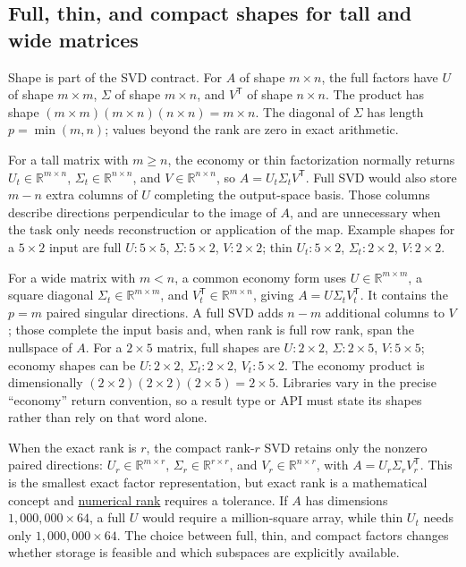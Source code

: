 \subsection{Full, thin, and compact shapes for tall and wide matrices}\label{02-foundations-ii-ch024-full-thin-and-compact-shapes-for-tall-and-wide-matrices}

\hypertarget{02-foundations-ii-ch024-full-thin-and-compact-shapes-for-tall-and-wide-matrices}{}

Shape is part of the SVD contract. For \(A\) of shape \(m\times n\), the full factors have \(U\) of shape \(m\times m\), \(\Sigma\) of shape \(m\times n\), and \(V^\mathsf T\) of shape \(n\times n\). The product has shape \((m\times m)(m\times n)(n\times n)=m\times n\). The diagonal of \(\Sigma\) has length \(p=\min(m,n)\); values beyond the rank are zero in exact arithmetic.

For a tall matrix with \(m\ge n\), the economy or thin factorization normally returns \(U_t\in\mathbb R^{m\times n}\), \(\Sigma_t\in\mathbb R^{n\times n}\), and \(V\in\mathbb R^{n\times n}\), so \(A=U_t\Sigma_tV^\mathsf T\). Full SVD would also store \(m-n\) extra columns of \(U\) completing the output-space basis. Those columns describe directions perpendicular to the image of \(A\), and are unnecessary when the task only needs reconstruction or application of the map. Example shapes for a \(5\times2\) input are full \(U:5\times5\), \(\Sigma:5\times2\), \(V:2\times2\); thin \(U_t:5\times2\), \(\Sigma_t:2\times2\), \(V:2\times2\).

For a wide matrix with \(m<n\), a common economy form uses \(U\in\mathbb R^{m\times m}\), a square diagonal \(\Sigma_t\in\mathbb R^{m\times m}\), and \(V_t^\mathsf T\in\mathbb R^{m\times n}\), giving \(A=U\Sigma_tV_t^\mathsf T\). It contains the \(p=m\) paired singular directions. A full SVD adds \(n-m\) additional columns to \(V\); those complete the input basis and, when rank is full row rank, span the nullspace of \(A\). For a \(2\times5\) matrix, full shapes are \(U:2\times2\), \(\Sigma:2\times5\), \(V:5\times5\); economy shapes can be \(U:2\times2\), \(\Sigma_t:2\times2\), \(V_t:5\times2\). The economy product is dimensionally \((2\times2)(2\times2)(2\times5)=2\times5\). Libraries vary in the precise ``economy'' return convention, so a result type or API must state its shapes rather than rely on that word alone.

When the exact rank is \(r\), the compact rank-\(r\) SVD retains only the nonzero paired directions: \(U_r\in\mathbb R^{m\times r}\), \(\Sigma_r\in\mathbb R^{r\times r}\), and \(V_r\in\mathbb R^{n\times r}\), with \(A=U_r\Sigma_rV_r^\mathsf T\). This is the smallest exact factor representation, but exact rank is a mathematical concept and \hyperref[01-foundations-i-ch019-a-system-is-an-intersection-of-constraints]{numerical rank} requires a tolerance. If \(A\) has dimensions \(1{,}000{,}000\times64\), a full \(U\) would require a million-square array, while thin \(U_t\) needs only \(1{,}000{,}000\times64\). The choice between full, thin, and compact factors changes whether storage is feasible and which subspaces are explicitly available.

